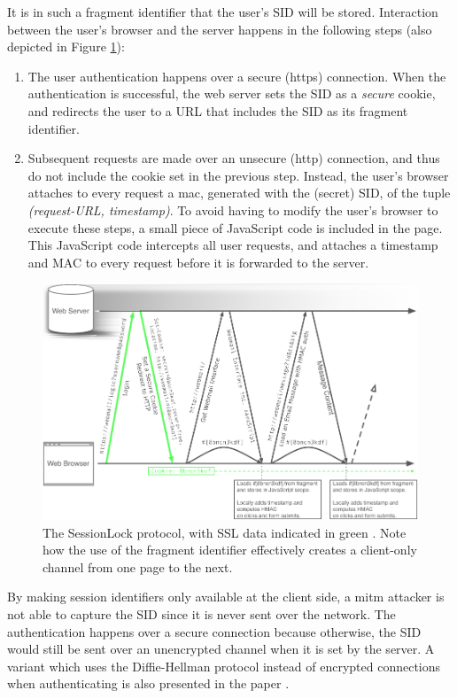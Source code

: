 It is in such a fragment identifier that the user's SID will be stored. Interaction between the user's browser and the server happens in the following steps (also depicted in Figure \ref{fig:sessionlock}):
\begin{enumerate}
	\item The user authentication happens over a secure (\gls{https}) connection. When the authentication is successful, the web server sets the SID as a \emph{secure} cookie, and redirects the user to a URL that includes the SID as its fragment identifier.
	\item Subsequent requests are made over an unsecure (\gls{http}) connection, and thus do not include the cookie set in the previous step. Instead, the user's browser attaches to every request a \gls{mac}, generated with the (secret) SID, of the tuple \emph{(request-URL, timestamp)}. To avoid having to modify the user's browser to execute these steps, a small piece of JavaScript code is included in the page. This JavaScript code intercepts all user requests, and attaches a timestamp and MAC to every request before it is forwarded to the server.
\end{enumerate}

\begin{figure}[htb]
	\centering
	\includegraphics[width=\textwidth]{img/sessionlock.png}
	\caption[The SessionLock protocol]{The SessionLock protocol, with SSL data indicated in green \cite{Adida2008}. Note how the use of the fragment identifier effectively creates a client-only channel from one page to the next.}
	\label{fig:sessionlock}
\end{figure}

By making session identifiers only available at the client side, a \gls{mitm} attacker is not able to capture the SID since it is never sent over the network. The authentication happens over a secure connection because otherwise, the SID would still be sent over an unencrypted channel when it is set by the server. A variant which uses the Diffie-Hellman protocol \cite{Diffie1976} instead of encrypted connections when authenticating is also presented in the paper \cite{Adida2008}.

